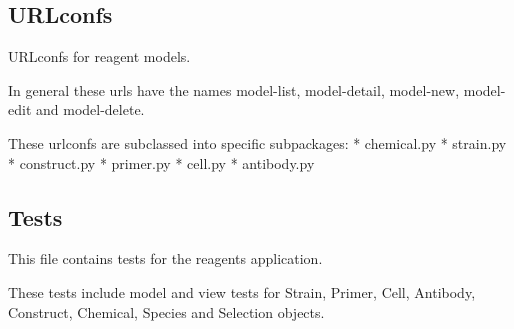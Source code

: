 \documentclass[letterpaper,10pt,english]{sphinxmanual}
\begin{document}
\subsection{URLconfs}
\label{api:id21}\label{api:module-experimentdb.reagents.urls}
URLconfs for reagent models.

In general these urls have the names model-list, model-detail, model-new, model-edit and model-delete.

These urlconfs are subclassed into specific subpackages:
* chemical.py
* strain.py
* construct.py
* primer.py
* cell.py
* antibody.py


\subsection{Tests}
\label{api:id22}\label{api:module-experimentdb.reagents.tests}
This file contains tests for the reagents application.

These tests include model and view tests for Strain, Primer, Cell, Antibody, Construct, Chemical, Species and Selection objects.
\end{document}
